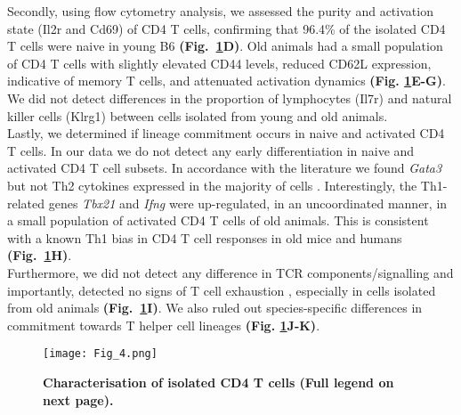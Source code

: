 Secondly, using flow cytometry analysis, we assessed the purity and activation state (Il2r\textalpha{} and Cd69) of CD4\plus{} T cells, confirming that 96.4\% of the isolated CD4\plus{} T cells were naive in young B6 \textbf{(Fig.~\ref{fig1:characterization}D)}. Old animals had a small population of CD4\plus{} T cells with slightly elevated CD44 levels, reduced CD62L expression, indicative of memory T cells, and attenuated activation dynamics \textbf{(Fig. \ref{fig1:characterization}E-G)}. We did not detect differences in the proportion of lymphocytes (\gls{Il7r}) and natural killer cells (\gls{Klrg1}) between cells isolated from young and old animals. \\

Lastly, we determined if lineage commitment occurs in naive and activated CD4\plus{} T cells. In our data we do not detect any early differentiation in naive and activated CD4\plus{} T cell subsets. In accordance with the literature we found \textit{Gata3} but not Th2 cytokines expressed in the majority of cells  \citep{Ho2009}. Interestingly, the Th1-related genes \textit{Tbx21} and \textit{Ifng} were up-regulated, in an uncoordinated manner, in a small population of activated CD4\plus{} T cells of old animals. This is consistent with a known Th1 bias in CD4\plus{} T cell responses in old mice \citep{Zhang2014} and humans \citep{Sakata-Kaneko2000} \textbf{(Fig.~\ref{fig1:characterization}H)}. \\

Furthermore, we did not detect any difference in TCR components/signalling and importantly, detected no signs of T cell exhaustion \citep{Wherry2011}, especially in cells isolated from old animals \textbf{(Fig.~\ref{fig1:characterization}I)}. We also ruled out species-specific differences in commitment towards T helper cell lineages \textbf{(Fig. \ref{fig1:characterization}J-K)}. 

\begin{figure}[!hb]
\centering
\texttt{[image: Fig\_4.png]}
\caption[Characterisation of isolated CD4\plus{} T cells]{\textbf{Characterisation of isolated CD4\plus{} T cells (Full legend on next page).}}
\label{fig1:characterization}
\end{figure}

